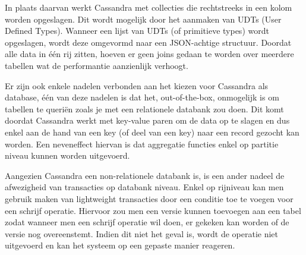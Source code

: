 \documentclass{article}
\begin{document}
	In plaats daarvan werkt Cassandra met collecties die rechtstreeks in een kolom worden opgeslagen. 
	Dit wordt mogelijk door het aanmaken van UDTs (User Defined Types). 
	Wanneer een lijst van UDTs (of primitieve types) wordt opgeslagen, wordt deze omgevormd naar een JSON-achtige structuur. 
	Doordat alle data in \'e\'en rij zitten, hoeven er geen joins gedaan te worden over meerdere tabellen 
	wat de performantie aanzienlijk verhoogt.
	\par
	Er zijn ook enkele nadelen verbonden aan het kiezen voor Cassandra als database, \'e\'en van deze nadelen is dat het, out-of-the-box,
	onmogelijk is om tabellen te queri\"en zoals je met een relationele databank zou doen. 
	Dit komt doordat Cassandra werkt met key-value paren om de data op te slagen en dus enkel aan de hand van een key 
	(of deel van een key) naar een record gezocht kan worden. 
	Een neveneffect hiervan is dat aggregatie functies enkel op partitie niveau kunnen worden uitgevoerd.
	\par
	Aangezien Cassandra een non-relationele databank is, is een ander nadeel de afwezigheid van transacties op databank niveau.
	Enkel op rijniveau kan men gebruik maken van lightweight transacties door een conditie toe te voegen voor een schrijf operatie.
	Hiervoor zou men een versie kunnen toevoegen aan een tabel zodat wanneer men een schrijf operatie wil doen,
	er gekeken kan worden of de versie nog overeenstemt. 
	Indien dit niet het geval is, wordt de operatie niet uitgevoerd en kan het systeem op een gepaste manier reageren.
\end{document}
